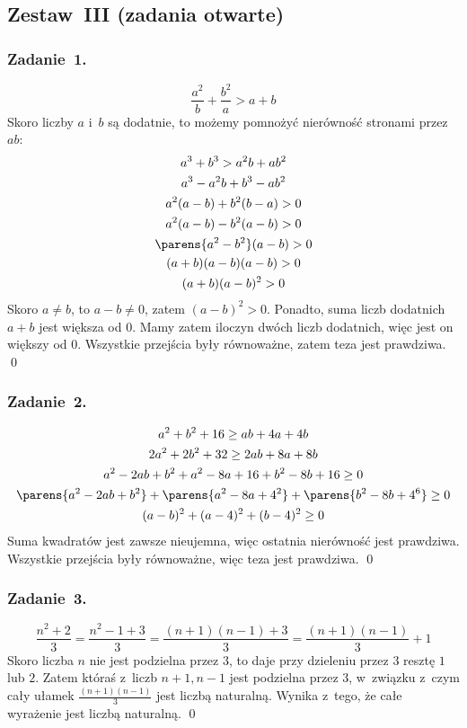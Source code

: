 \subsection*{Zestaw~III (zadania otwarte)}
\subsubsection*{Zadanie~1.}
\begin{equation*}
    \frac{a^2}{b} + \frac{b^2}{a} > a + b
\end{equation*}
Skoro liczby \(a\) i~\(b\) są dodatnie, to możemy pomnożyć nierówność stronami przez \(ab\):
\begin{gather*}
    a^3 + b^3 > a^2b + ab^2\\
    a^3 - a^2b + b^3 - ab^2\\
    a^2(a - b) + b^2(b - a) > 0\\
    a^2(a - b) - b^2(a - b) > 0\\
    \parens{a^2 - b^2}(a - b) > 0\\
    (a + b)(a - b)(a - b) > 0\\
    (a + b)(a - b)^2 > 0
\end{gather*}
Skoro \(a \neq b\), to \(a - b \neq 0\), zatem \((a - b)^2 > 0\). Ponadto, suma liczb dodatnich \(a + b\) jest większa od \(0\). Mamy zatem iloczyn dwóch liczb dodatnich, więc jest on większy od \(0\). Wszystkie przejścia były równoważne, zatem teza jest prawdziwa.
\qed
\subsubsection*{Zadanie~2.}
\begin{gather*}
    a^2 + b^2 + 16 \geq ab + 4a + 4b\\
    2a^2 + 2b^2 + 32 \geq 2ab + 8a + 8b\\
    a^2 - 2ab + b^2 + a^2 - 8a + 16 + b^2 - 8b + 16 \geq 0\\
    \parens{a^2 - 2ab + b^2} + \parens{a^2 - 8a + 4^2} + \parens{b^2 - 8b + 4^6} \geq 0\\
    (a - b)^2 + (a - 4)^2 + (b - 4)^2 \geq 0
\end{gather*}
Suma kwadratów jest zawsze nieujemna, więc ostatnia nierówność jest prawdziwa. Wszystkie przejścia były równoważne, więc teza jest prawdziwa.
\qed
\subsubsection*{Zadanie~3.}
\begin{equation*}
    \frac{n^2 + 2}{3} = \frac{n^2 - 1 + 3}{3} = \frac{(n + 1)(n - 1) + 3}{3} = \frac{(n + 1)(n - 1)}{3} + 1
\end{equation*}
Skoro liczba \(n\) nie jest podzielna przez \(3\), to daje przy dzieleniu przez \(3\) resztę \(1\) lub \(2\). Zatem któraś z~liczb \(n + 1, n - 1\) jest podzielna przez \(3\), w~związku z~czym cały ułamek \(\frac{(n + 1)(n - 1)}{3}\) jest liczbą naturalną. Wynika z~tego, że całe wyrażenie jest liczbą naturalną.
\qed
